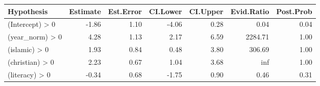 \begin{tabular}{lrrrrrr}
\toprule
Hypothesis & Estimate & Est.Error & CI.Lower & CI.Upper & Evid.Ratio & Post.Prob \\
\midrule
(Intercept) > 0 & -1.86 & 1.10 & -4.06 & 0.28 & 0.04 & 0.04 \\
(year_norm) > 0 & 4.28 & 1.13 & 2.17 & 6.59 & 2284.71 & 1.00 \\
(islamic) > 0 & 1.93 & 0.84 & 0.48 & 3.80 & 306.69 & 1.00 \\
(christian) > 0 & 2.23 & 0.67 & 1.04 & 3.68 & inf & 1.00 \\
(literacy) > 0 & -0.34 & 0.68 & -1.75 & 0.90 & 0.46 & 0.31 \\
\bottomrule
\end{tabular}
